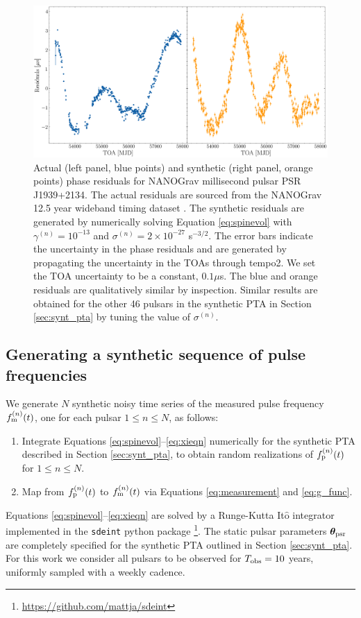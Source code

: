 \documentclass[fleqn,usenatbib,useAMS]{mnras}
\providecommand{\DIFadd}[1]{{\protect\color{blue}\uwave{#1}}} %
\providecommand{\DIFaddFL}[1]{\DIFadd{#1}} %
\providecommand{\DIFaddbeginFL}{} %
\providecommand{\DIFaddendFL}{} %
\newcommand{\DIFaddincludegraphics}[2][]{{\color{blue}\fbox{\DIFOincludegraphics[#1]{#2}}}} %
\DeclareRobustCommand{\DIFaddbeginFL}{\DIFOaddbeginFL \let\includegraphics\DIFaddincludegraphics} %
\DeclareRobustCommand{\DIFaddendFL}{\DIFOaddendFL \let\includegraphics\DIFOincludegraphics} %
\begin{document}
\begin{figure}
	\includegraphics[width=\columnwidth]{images/example_residuals_plot2}
	\caption{Actual (left panel, blue points) and synthetic (right panel, orange points) phase residuals for NANOGrav millisecond pulsar PSR J1939+2134. The actual residuals are sourced from the NANOGrav 12.5 year wideband timing dataset \citep{pennucci_timothy_t_2020_4312887,nanogravwideband}. The synthetic residuals are generated by numerically solving Equation \eqref{eq:spinevol} with $\gamma^{(n)} = 10^{-13}$ \DIFaddbeginFL \DIFaddFL{s$^{-1}$ }\DIFaddendFL and $\sigma^{(n)} = 2\times 10^{-27}$ s$^{-3/2}$. The error bars indicate the uncertainty in the phase residuals and are generated by propagating the uncertainty in the TOAs through {\sc tempo2}. We set the TOA uncertainty to be a constant, \DIFaddbeginFL \DIFaddFL{viz. }\DIFaddendFL $0.1 \mu$s. The blue and orange residuals are qualitatively similar by inspection. Similar results are obtained for the other 46 pulsars in the synthetic PTA in Section \ref{sec:synt_pta} by tuning the value of $\sigma^{(n)}$.}
	\label{fig:qualitative_compare}
\end{figure}
\subsection{Generating a synthetic sequence of pulse frequencies}\label{sec:gendata}
We generate $N$ synthetic noisy time series of the measured pulse frequency $f_{\rm m}^{(n)}(t)$, one for each pulsar $1\leq n \leq N$, as follows:
\begin{enumerate}[leftmargin=2em]
	\item Integrate Equations \eqref{eq:spinevol}--\eqref{eq:xieqn} numerically for the synthetic PTA described in Section \ref{sec:synt_pta}, to obtain random realizations of $f_{\rm p}^{(n)}(t)$ for $1\leq n \leq N$.
	\item Map from $f_{\rm p}^{(n)}(t)$ to $f_{\rm m}^{(n)}(t)$ via Equations \eqref{eq:measurement} and \eqref{eq:g_func}.
\end{enumerate}
Equations \eqref{eq:spinevol}--\eqref{eq:xieqn} are solved by a Runge-Kutta It$\hat{\text{o}}$ integrator implemented in the \texttt{sdeint} python package \footnote{\url{https://github.com/mattja/sdeint}}. The static pulsar parameters  $\boldsymbol{\theta}_{\rm psr}$ are completely specified for the synthetic PTA outlined in Section \ref{sec:synt_pta}. For this work we consider all pulsars to be observed for $T_{\rm obs} =10$ years, uniformly sampled with a weekly cadence. \newline 
\end{document}
